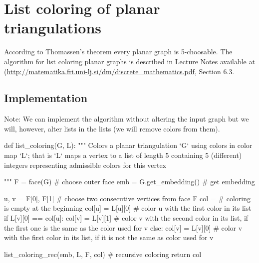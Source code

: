 \chapter{List coloring of planar triangulations}

According to Thomassen's theorem every planar graph is 5-choosable. The algorithm for list coloring planar graphs is described in Lecture Notes available at \url{(http://matematika.fri.uni-lj.si/dm/discrete_mathematics.pdf}, Section 6.3.

\section{Implementation}

Note: We can implement the algorithm without altering the input graph but we will, however, alter lists in the lists (we will remove colors from them).

\begin{sageCell}
def list_coloring(G, L):
    """
    Colors a planar triangulation `G` using colors in color map `L`; that is `L` maps a vertex to a list of length 5 containing
    5 (different) integers representing admissible colors for this vertex

    """
    F = face(G)  # choose outer face
    emb = G.get_embedding()  # get embedding

    u, v = F[0], F[1]  # choose two consecutive vertices from face F
    col = {}  # coloring is empty at the beginning
    col[u] = L[u][0]  # color u with the first color in its list
    if L[v][0] == col[u]:
        col[v] = L[v][1]  # color v with the second color in its list, if the first one is the same as the color used for v
    else:
        col[v] = L[v][0]  # color v with the first color in its list, if it is not the same as color used for v

    list_coloring_rec(emb, L, F, col)  # recursive coloring
    return col
\end{sageCell}


